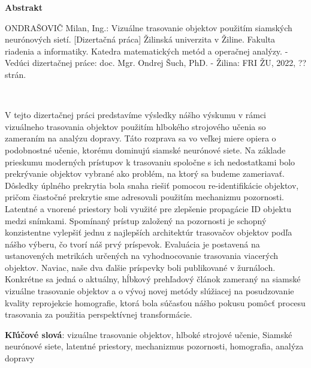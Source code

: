 \thispagestyle{empty}

\begin{center}
    \Large{\textbf{Abstrakt}}
\end{center}

\noindent ONDRAŠOVIČ Milan, Ing.: Vizuálne trasovanie objektov použitím siamských neurónových sietí.
[Dizertačná práca] Žilinská univerzita v Žiline. Fakulta riadenia a informatiky. Katedra matematických metód a operačnej analýzy. - Vedúci dizertačnej práce: doc. Mgr. Ondrej Šuch, PhD. - Žilina: FRI ŽU, 2022, ?? strán.

\


\noindent V tejto dizertačnej práci predstavíme výsledky nášho výskumu v rámci vizuálneho trasovania objektov použitím hlbokého strojového učenia so zameraním na analýzu dopravy. Táto rozprava sa vo veľkej miere opiera o podobnostné učenie, ktorému dominujú siamské neurónové siete. Na základe prieskumu moderných prístupov k trasovaniu spoločne s ich nedostatkami bolo prekrývanie objektov vybrané ako problém, na ktorý sa budeme zameriavať. Dôsledky úplného prekrytia bola snaha riešiť pomocou re-identifikácie objektov, pričom čiastočné prekrytie sme adresovali použitím mechanizmu pozornosti. Latentné a vnorené priestory boli využité pre zlepšenie propagácie ID objektu medzi snímkami. Spomínaný prístup založený na pozornosti je schopný konzistentne vylepšiť jednu z najlepších architektúr trasovačov objektov podľa nášho výberu, čo tvorí náš prvý príspevok. Evaluácia je postavená na ustanovených metrikách určených na vyhodnocovanie trasovania viacerých objektov. Naviac, naše dva ďalšie príspevky boli publikované v žurnáloch. Konkrétne sa jedná o aktuálny, hĺbkový prehľadový článok zameraný na siamské vizuálne trasovanie objektov a o vývoj novej metódy slúžiacej na posudzovanie kvality reprojekcie homografie, ktorá bola súčasťou nášho pokusu pomôcť procesu trasovania za použitia perspektívnej transformácie.

\noindent \textbf{Kľúčové slová}: vizuálne trasovanie objektov, hlboké strojové učenie, Siamské neurónové siete, latentné priestory, mechanizmus pozornosti, homografia, analýza dopravy
